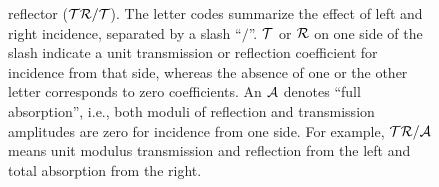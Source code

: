 \begin{figure}
{reflector ($\cal{TR/T}$).
The letter codes summarize the effect of left and right incidence, separated by a  slash ``$/$''.
${\cal T}$ or ${\cal R}$ on one side of the slash indicate a unit
transmission or reflection coefficient
for  incidence from that side, whereas the absence of one or the other letter corresponds to zero coefficients.
An ${\cal A}$ denotes ``full absorption'', i.e., both moduli of reflection and transmission amplitudes are zero for incidence from one side.
For example,  $\cal{TR/A}$ means unit modulus transmission
and reflection from the left and total absorption from the right.
\label{cases}}
\end{figure}


